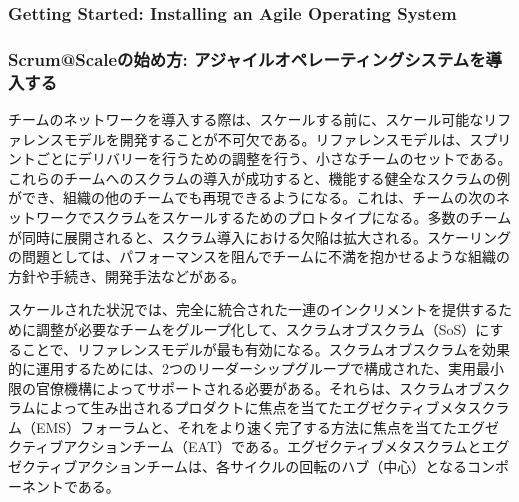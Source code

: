 \documentclass[12pt,a4paper,parskip=full]{scrartcl}
\begin{document}
\subsubsection{Getting Started: Installing an Agile Operating
System}\label{getting-started-installing-an-agile-operating-system}
\fi
\subsubsection{Scrum@Scaleの始め方: アジャイルオペレーティングシステムを導入する}\label{getting-started-installing-an-agile-operating-system}

チームのネットワークを導入する際は、スケールする前に、スケール可能なリファレンスモデルを開発することが不可欠である。リファレンスモデルは、スプリントごとにデリバリーを行うための調整を行う、小さなチームのセットである。これらのチームへのスクラムの導入が成功すると、機能する健全なスクラムの例ができ、組織の他のチームでも再現できるようになる。これは、チームの次のネットワークでスクラムをスケールするためのプロトタイプになる。多数のチームが同時に展開されると、スクラム導入における欠陥は拡大される。スケーリングの問題としては、パフォーマンスを阻んでチームに不満を抱かせるような組織の方針や手続き、開発手法などがある。

スケールされた状況では、完全に統合された一連のインクリメントを提供するために調整が必要なチームをグループ化して、スクラムオブスクラム（SoS）にすることで、リファレンスモデルが最も有効になる。スクラムオブスクラムを効果的に運用するためには、2つのリーダーシップグループで構成された、実用最小限の官僚機構によってサポートされる必要がある。それらは、スクラムオブスクラムによって生み出されるプロダクトに焦点を当てたエグゼクティブメタスクラム（EMS）フォーラムと、それをより速く完了する方法に焦点を当てたエグゼクティブアクションチーム（EAT）である。エグゼクティブメタスクラムとエグゼクティブアクションチームは、各サイクルの回転のハブ（中心）となるコンポーネントである。
\end{document}
